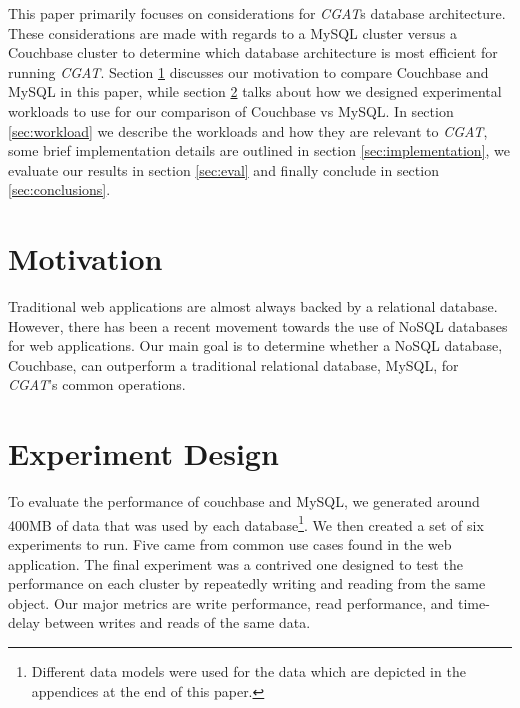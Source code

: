 \documentclass[10pt, conference, compsocconf]{IEEEtran}
\begin{document}

This paper primarily focuses on considerations for \textit{CGAT}s database
architecture. These considerations are made with regards to a MySQL cluster
versus a Couchbase cluster to determine which database architecture is most
efficient for running \textit{CGAT}. Section \ref{sec:motive} discusses our
motivation to compare Couchbase and MySQL in this paper, while section
\ref{sec:design} talks about how we designed experimental workloads to use for
our comparison of Couchbase vs MySQL. In section \ref{sec:workload} we
describe the workloads and how they are relevant to \textit{CGAT}, some brief
implementation details are outlined in section \ref{sec:implementation}, we
evaluate our results in section \ref{sec:eval} and finally conclude in
section \ref{sec:conclusions}.

\section{Motivation}\label{sec:motive}
Traditional web applications are almost always backed by a relational database.
However, there has been a recent movement towards the use of NoSQL databases for
web applications. Our main goal is to determine whether a NoSQL database, Couchbase,
can outperform a traditional relational database, MySQL, for \textit{CGAT}'s
common operations.

\section{Experiment Design}\label{sec:design}
To evaluate the performance of couchbase and MySQL, we generated around 400MB
of data that was used by each database\footnote{Different data models were used
for the data which are depicted in the appendices at the end of this paper.}.
We then created a set of six experiments to run. Five came from common use
cases found in the web application. The final experiment was a contrived one
designed to test the performance on each cluster by repeatedly writing and
reading from the same object. Our major metrics are write performance, read
performance, and time-delay between writes and reads of the same data.
\end{document}
